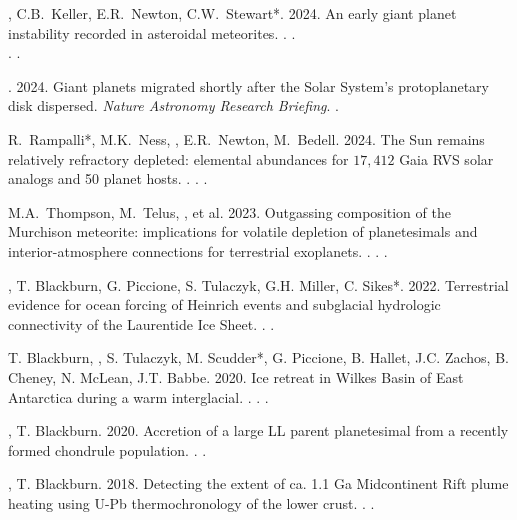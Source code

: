 \begin{etaremune} [itemsep=4pt, leftmargin=3ex]
    \item \ghedwards, C.B.~Keller, E.R.~Newton, C.W.~Stewart*. 2024. An early giant planet instability recorded in asteroidal meteorites. . . \\. .
    
    \item \ghedwards. 2024. Giant planets migrated shortly after the Solar System’s protoplanetary disk dispersed. \textit{Nature Astronomy Research Briefing}. .
    
    \item R.~Rampalli*, M.K.~Ness, \ghedwards, E.R.~Newton, M.~Bedell. 2024. The Sun remains relatively refractory depleted: elemental abundances for $17,412$ Gaia RVS solar analogs and 50 planet hosts. . . .
    
    \item M.A.~Thompson, M.~Telus, \ghedwards, et al. 2023. Outgassing composition of the Murchison meteorite: implications for volatile depletion of planetesimals and interior-atmosphere connections for terrestrial exoplanets. . . .
    
    \item \ghedwards, T. Blackburn, G. Piccione, S. Tulaczyk, G.H. Miller, C. Sikes*. 2022. Terrestrial evidence for ocean forcing of Heinrich events and subglacial hydrologic connectivity of the Laurentide Ice Sheet. . .
    
    \item T. Blackburn, \ghedwards, S. Tulaczyk, M. Scudder*, G. Piccione, B. Hallet, J.C. Zachos, B. Cheney, N. McLean, J.T. Babbe. 2020. Ice retreat in Wilkes Basin of East Antarctica during a warm interglacial. . . .
    
    \item \ghedwards, T. Blackburn. 2020. Accretion of a large LL parent planetesimal from a recently formed chondrule population. . .
    
    \item \ghedwards, T. Blackburn. 2018. Detecting the extent of ca. 1.1 Ga Midcontinent Rift plume heating using U-Pb thermochronology of the lower crust. . .
    


\end{etaremune}

